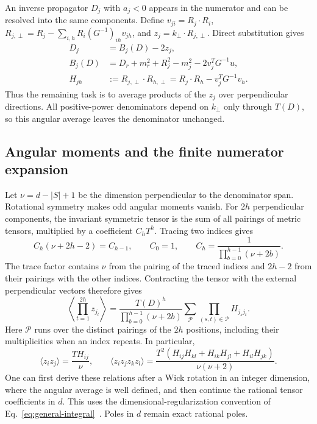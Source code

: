 An inverse propagator $D_j$ with $a_j<0$ appears in the numerator and can be resolved into the same components. Define $v_{ji}=R_j\cdot R_i$, $R_{j,\perp}=R_j-\sum_{i,h}R_i(G^{-1})_{ih}v_{jh}$, and $z_j=k_\perp\cdot R_{j,\perp}$. Direct substitution gives
\begin{align}
 D_j&=B_j(D)-2z_j,\\
 B_j(D)&=D_r+m_r^2+R_j^2-m_j^2-2v_j^TG^{-1}u,\\
 H_{jh}&:=R_{j,\perp}\cdot R_{h,\perp}
       =R_j\cdot R_h-v_j^TG^{-1}v_h.
 \label{eq:notes-tensor-numerator}
\end{align}
Thus the remaining task is to average products of the $z_j$ over perpendicular directions. All positive-power denominators depend on $k_\perp$ only through $T(D)$, so this angular average leaves the denominator unchanged.

\subsection{Angular moments and the finite numerator expansion}
Let $\nu=d-|S|+1$ be the dimension perpendicular to the denominator span. Rotational symmetry makes odd angular moments vanish. For $2h$ perpendicular components, the invariant symmetric tensor is the sum of all pairings of metric tensors, multiplied by a coefficient $C_h T^h$. Tracing two indices gives
\begin{equation}
 C_h(\nu+2h-2)=C_{h-1},\qquad C_0=1,
 \qquad C_h=\frac{1}{\prod_{b=0}^{h-1}(\nu+2b)}.
 \label{eq:notes-tensor-trace}
\end{equation}
The trace factor contains $\nu$ from the pairing of the traced indices and $2h-2$ from their pairings with the other indices. Contracting the tensor with the external perpendicular vectors therefore gives
\begin{equation}
 \left\langle\prod_{t=1}^{2h}z_{j_t}\right\rangle
 =\frac{T(D)^h}{\prod_{b=0}^{h-1}(\nu+2b)}
 \sum_{\mathcal P}\prod_{(s,t)\in\mathcal P}H_{j_sj_t}.
 \label{eq:notes-tensor-moment}
\end{equation}
Here $\mathcal P$ runs over the distinct pairings of the $2h$ positions, including their multiplicities when an index repeats. In particular,
\begin{equation}
 \langle z_i z_j\rangle=\frac{T H_{ij}}{\nu},\qquad
 \langle z_i z_j z_k z_l\rangle
 =\frac{T^2(H_{ij}H_{kl}+H_{ik}H_{jl}+H_{il}H_{jk})}{\nu(\nu+2)}.
 \label{eq:notes-tensor-low-moments}
\end{equation}
One can first derive these relations after a Wick rotation in an integer dimension, where the angular average is well defined, and then continue the rational tensor coefficients in $d$. This uses the dimensional-regularization convention of Eq.~\eqref{eq:general-integral}~\cite{Weinzierl2022}. Poles in $d$ remain exact rational poles.

